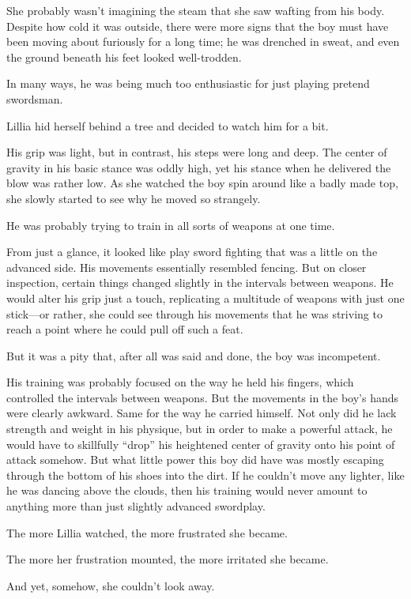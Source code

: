 She probably wasn’t imagining the steam that she saw wafting from his body. Despite how cold it was outside, there were more signs that the boy must have been moving about furiously for a long time; he was drenched in sweat, and even the ground beneath his feet looked well-trodden.

In many ways, he was being much too enthusiastic for just playing pretend swordsman.

Lillia hid herself behind a tree and decided to watch him for a bit.

His grip was light, but in contrast, his steps were long and deep. The center of gravity in his basic stance was oddly high, yet his stance when he delivered the blow was rather low. As she watched the boy spin around like a badly made top, she slowly started to see why he moved so strangely.

He was probably trying to train in all sorts of weapons at one time.

From just a glance, it looked like play sword fighting that was a little on the advanced side. His movements essentially resembled fencing. But on closer inspection, certain things changed slightly in the intervals between weapons. He would alter his grip just a touch, replicating a multitude of weapons with just one stick—or rather, she could see through his movements that he was striving to reach a point where he could pull off such a feat.

But it was a pity that, after all was said and done, the boy was incompetent.

His training was probably focused on the way he held his fingers, which controlled the intervals between weapons. But the movements in the boy’s hands were clearly awkward. Same for the way he carried himself. Not only did he lack strength and weight in his physique, but in order to make a powerful attack, he would have to skillfully “drop” his heightened center of gravity onto his point of attack somehow. But what little power this boy did have was mostly escaping through the bottom of his shoes into the dirt. If he couldn’t move any lighter, like he was dancing above the clouds, then his training would never amount to anything more than just slightly advanced swordplay.

The more Lillia watched, the more frustrated she became.

The more her frustration mounted, the more irritated she became.

And yet, somehow, she couldn’t look away.

